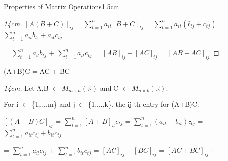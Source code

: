 \begin{ltheorem}{Properties of Matrix Operations}{1.5cm}
\begin{proof}[14cm]
                \hspace{0.5cm}
                $[A(B+C)]_{ij}$ = $\sum_{t=1}^n a_{it}[B+C]_{tj}$
                = $\sum_{t=1}^n a_{it}(b_{tj}+c_{tj})$
                = $\sum_{t=1}^n a_{it}b_{tj} + a_{it}c_{tj}$

                \hspace{0.5cm}
                = $\sum_{t=1}^n a_{it}b_{tj}$ + $\sum_{t=1}^n a_{it}c_{tj}$
                = $[AB]_{ij} + [AC]_{ij}$
                = $[AB + AC]_{ij}$
            \end{proof}
        
        \item (A+B)C = AC + BC
        
            \begin{proof}[14cm]
                Let A,B $\in$ $M_{m \times n}(\mathbb{R})$ and
                C $\in$ $M_{n \times k}(\mathbb{R})$.
                
                For i $\in$ \{1,...,m\} and j $\in$ \{1,...,k\},
                the ij-th entry for (A+B)C:

                \hspace{0.5cm}
                $[(A+B)C]_{ij}$ = $\sum_{t=1}^n [A+B]_{it}c_{tj}$
                = $\sum_{t=1}^n (a_{it}+b_{it})c_{tj}$
                = $\sum_{t=1}^n a_{it}c_{tj} + b_{it}c_{tj}$

                \hspace{0.5cm}
                = $\sum_{t=1}^n a_{it}c_{tj}$ + $\sum_{t=1}^n b_{it}c_{tj}$
                = $[AC]_{ij} + [BC]_{ij}$
                = $[AC + BC]_{ij}$
            \end{proof}
    \end{ltheorem}

    \newpage



